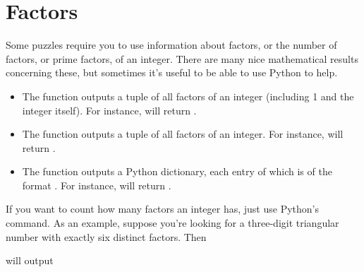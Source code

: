 \documentclass[letterpaper,10pt,english]{sphinxmanual}
\begin{document}
\section{Factors}
\label{\detokenize{index:factors}}
Some puzzles require you to use information about factors, or the number of factors, or prime factors, of an integer. There are many nice mathematical results concerning these, but sometimes it’s useful to be able to use Python to help.
\begin{itemize}
\item {} 
The function  outputs a tuple of all factors of an integer (including 1 and the integer itself). For instance,  will return .

\item {} 
The function  outputs a tuple of all  factors of an integer. For instance,  will return .

\item {} 
The function  outputs a Python dictionary, each entry of which is of the format . For instance,  will return .

\end{itemize}

If you want to count how many factors an integer  has, just use Python’s  command. As an example, suppose you’re looking for a three-digit triangular number with exactly six distinct factors. Then

\begin{sphinxVerbatim}[commandchars=\\\{\}]
   
    
       
\end{sphinxVerbatim}

will output

\begin{sphinxVerbatim}[commandchars=\\\{\}]
      
      
      
\end{sphinxVerbatim}
\end{document}
